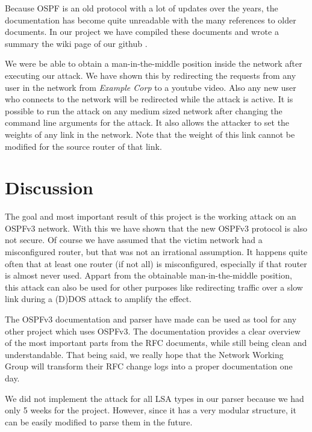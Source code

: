 \documentclass[11pt,a4paper,oneside]{article}
\newcommand{\lsection}[2]{\section{#1}\label{sec:#2}}
\begin{document}
		Because OSPF is an old protocol with a lot of updates over the years, the documentation has become quite unreadable with the many references to older documents. In our project we have compiled these documents and wrote a summary the wiki page of our github \cite{wiki}.
		
		We were be able to obtain a man-in-the-middle position inside the network after executing our attack. We have shown this by redirecting the requests from any user in the network from \textit{Example Corp} to a youtube video. Also any new user who connects to the network will be redirected while the attack is active.
		It is possible to run the attack on any medium sized network after changing the command line arguments for the attack. It also allows the attacker to set the weights of any link in the network. Note that the weight of this link cannot be modified for the source router of that link.
    		
    		
    \lsection{Discussion}{discussion}
    		The goal and most important result of this project is the working attack on an OSPFv3 network. With this we have shown that the new OSPFv3 protocol is also not secure. Of course we have assumed that the victim network had a misconfigured router, but that was not an irrational assumption. It happens quite often that at least one router (if not all) is misconfigured, especially if that router is almost never used.
    		Appart from the obtainable man-in-the-middle position, this attack can also be used for other purposes like redirecting traffic over a slow link during a (D)DOS attack to amplify the effect.
    		
		The OSPFv3 documentation and parser have made can be used as tool for any other project which uses OSPFv3.
		The documentation provides a clear overview of the most important parts from the RFC documents, while still being clean and understandable. That being said, we really hope that the Network Working Group will transform their RFC change logs into a proper documentation one day.
		
		We did not implement the attack for all LSA types in our parser because we had only 5 weeks for the project. However, since it has a very modular structure, it can be easily modified to parse them in the future.
		
\end{document}
